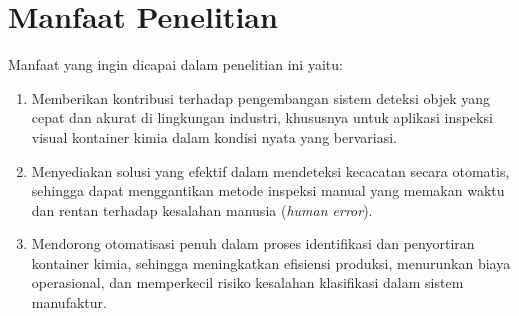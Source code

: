 \vspace{1em}

\section{Manfaat Penelitian}
Manfaat yang ingin dicapai dalam penelitian ini yaitu:
\begin{enumerate}
  \item Memberikan kontribusi terhadap pengembangan sistem deteksi
    objek yang cepat dan akurat di lingkungan industri, khususnya
    untuk aplikasi inspeksi visual kontainer kimia dalam kondisi
    nyata yang bervariasi.
  \item Menyediakan solusi yang efektif dalam mendeteksi kecacatan secara
    otomatis, sehingga dapat menggantikan metode inspeksi manual yang
    memakan waktu dan rentan terhadap kesalahan manusia (\textit{human error}).
  \item Mendorong otomatisasi penuh dalam proses identifikasi dan
    penyortiran kontainer kimia, sehingga meningkatkan efisiensi
    produksi, menurunkan biaya operasional, dan memperkecil risiko
    kesalahan klasifikasi dalam sistem manufaktur.
\end{enumerate}
